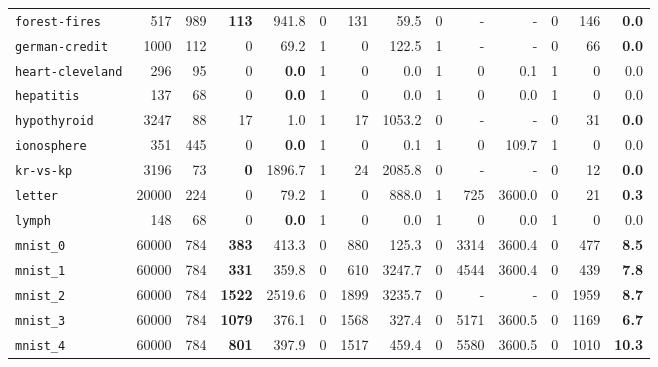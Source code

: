 \begin{tabular}{lccrrrrrrrrrrr}
\texttt{forest-fires} & \multicolumn{1}{r}{517} & \multicolumn{1}{r}{989}  & \textbf{113} & 941.8 & 0 & 131 & 59.5 & 0 & - & - & 0 & 146 & \textbf{0.0}\\
\texttt{german-credit} & \multicolumn{1}{r}{1000} & \multicolumn{1}{r}{112}  & 0 & 69.2 & 1 & 0 & 122.5 & 1 & - & - & 0 & 66 & \textbf{0.0}\\
\texttt{heart-cleveland} & \multicolumn{1}{r}{296} & \multicolumn{1}{r}{95}  & 0 & \textbf{0.0} & 1 & 0 & 0.0 & 1 & 0 & 0.1 & 1 & 0 & 0.0\\
\texttt{hepatitis} & \multicolumn{1}{r}{137} & \multicolumn{1}{r}{68}  & 0 & \textbf{0.0} & 1 & 0 & 0.0 & 1 & 0 & 0.0 & 1 & 0 & 0.0\\
\texttt{hypothyroid} & \multicolumn{1}{r}{3247} & \multicolumn{1}{r}{88}  & 17 & 1.0 & 1 & 17 & 1053.2 & 0 & - & - & 0 & 31 & \textbf{0.0}\\
\texttt{ionosphere} & \multicolumn{1}{r}{351} & \multicolumn{1}{r}{445}  & 0 & \textbf{0.0} & 1 & 0 & 0.1 & 1 & 0 & 109.7 & 1 & 0 & 0.0\\
\texttt{kr-vs-kp} & \multicolumn{1}{r}{3196} & \multicolumn{1}{r}{73}  & \textbf{0} & 1896.7 & 1 & 24 & 2085.8 & 0 & - & - & 0 & 12 & \textbf{0.0}\\
\texttt{letter} & \multicolumn{1}{r}{20000} & \multicolumn{1}{r}{224}  & 0 & 79.2 & 1 & 0 & 888.0 & 1 & 725 & 3600.0 & 0 & 21 & \textbf{0.3}\\
\texttt{lymph} & \multicolumn{1}{r}{148} & \multicolumn{1}{r}{68}  & 0 & \textbf{0.0} & 1 & 0 & 0.0 & 1 & 0 & 0.0 & 1 & 0 & 0.0\\
\texttt{mnist\_0} & \multicolumn{1}{r}{60000} & \multicolumn{1}{r}{784}  & \textbf{383} & 413.3 & 0 & 880 & 125.3 & 0 & 3314 & 3600.4 & 0 & 477 & \textbf{8.5}\\
\texttt{mnist\_1} & \multicolumn{1}{r}{60000} & \multicolumn{1}{r}{784}  & \textbf{331} & 359.8 & 0 & 610 & 3247.7 & 0 & 4544 & 3600.4 & 0 & 439 & \textbf{7.8}\\
\texttt{mnist\_2} & \multicolumn{1}{r}{60000} & \multicolumn{1}{r}{784}  & \textbf{1522} & 2519.6 & 0 & 1899 & 3235.7 & 0 & - & - & 0 & 1959 & \textbf{8.7}\\
\texttt{mnist\_3} & \multicolumn{1}{r}{60000} & \multicolumn{1}{r}{784}  & \textbf{1079} & 376.1 & 0 & 1568 & 327.4 & 0 & 5171 & 3600.5 & 0 & 1169 & \textbf{6.7}\\
\texttt{mnist\_4} & \multicolumn{1}{r}{60000} & \multicolumn{1}{r}{784}  & \textbf{801} & 397.9 & 0 & 1517 & 459.4 & 0 & 5580 & 3600.5 & 0 & 1010 & \textbf{10.3}\\

\end{tabular}
